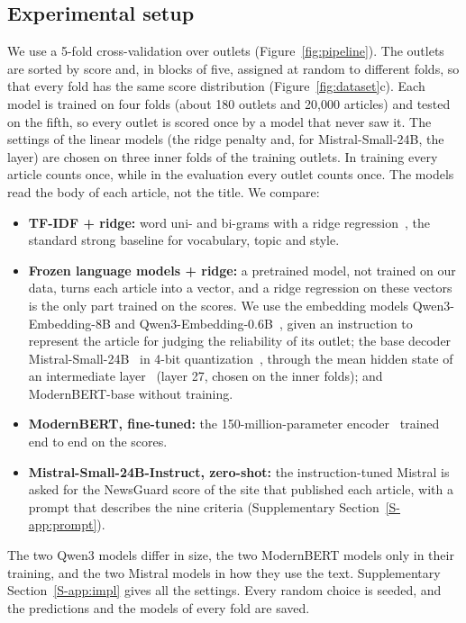 \documentclass[11pt,a4paper]{article}
\begin{document}
\subsection{Experimental setup}\label{sec:setup}
We use a 5-fold cross-validation over outlets (Figure~\ref{fig:pipeline}). The outlets are sorted by score and, in
blocks of five, assigned at random to different folds, so that every fold has the same score distribution
(Figure~\ref{fig:dataset}c). Each model is trained on four folds (about 180 outlets and 20,000 articles) and tested on
the fifth, so every outlet is scored once by a model that never saw it. The settings of the linear models (the ridge
penalty and, for Mistral-Small-24B, the layer) are chosen on three inner folds of the training outlets. In training every
article counts once, while in the evaluation every outlet counts once. The models read the body of each article, not the
title. We compare:
\begin{itemize}
  \item \textbf{TF-IDF + ridge:} word uni- and bi-grams with a ridge regression~\cite{hoerl1970ridge}, the standard
        strong baseline for vocabulary, topic and style.
  \item \textbf{Frozen language models + ridge:} a pretrained model, not trained on our data, turns each article into a
        vector, and a ridge regression on these vectors is the only part trained on the scores. We use the embedding
        models Qwen3-Embedding-8B and Qwen3-Embedding-0.6B~\cite{zhang2025qwen3}, given an instruction to represent the
        article for judging the reliability of its outlet; the base decoder Mistral-Small-24B~\cite{mistralsmall} in
        4-bit quantization~\cite{dettmers2023qlora}, through the mean hidden state of an intermediate
        layer~\cite{skean2025layer} (layer 27, chosen on the inner folds); and ModernBERT-base without training.
  \item \textbf{ModernBERT, fine-tuned:} the 150-million-parameter encoder~\cite{warner2024modernbert} trained end to end
        on the scores.
  \item \textbf{Mistral-Small-24B-Instruct, zero-shot:} the instruction-tuned Mistral is asked for the NewsGuard score of
        the site that published each article, with a prompt that describes the nine criteria (Supplementary
        Section~\ref{S-app:prompt}).
\end{itemize}
The two Qwen3 models differ in size, the two ModernBERT models only in their training, and the two Mistral models in how
they use the text. Supplementary Section~\ref{S-app:impl} gives all the settings. Every random choice is seeded, and the
predictions and the models of every fold are saved.
\end{document}
